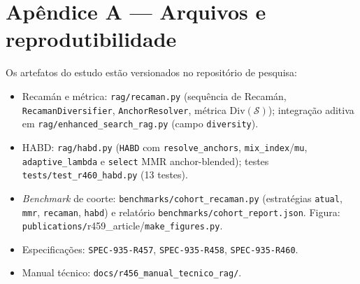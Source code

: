 \documentclass[11pt,a4paper]{article}
\newcommand{\Div}{\mathrm{Div}}
\begin{document}



\appendix
\section*{Apêndice A — Arquivos e reprodutibilidade}
Os artefatos do estudo estão versionados no repositório de pesquisa:
\begin{itemize}
  \item Recamán e métrica: \texttt{rag/recaman.py} (sequência de Recamán,
        \texttt{RecamanDiversifier}, \texttt{AnchorResolver}, métrica
        $\Div(\mathcal{S})$); integração aditiva em
        \texttt{rag/enhanced\_search\_rag.py} (campo \texttt{diversity}).
  \item HABD: \texttt{rag/habd.py} (\texttt{HABD} com \texttt{resolve\_anchors},
        \texttt{mix\_index}/\texttt{mu}, \texttt{adaptive\_lambda} e
        \texttt{select} MMR anchor-blended); testes
        \texttt{tests/test\_r460\_habd.py} (13 testes).
  \item \emph{Benchmark} de coorte: \texttt{benchmarks/cohort\_recaman.py}
        (estratégias \texttt{atual}, \texttt{mmr}, \texttt{recaman},
        \texttt{habd}) e relatório \texttt{benchmarks/cohort\_report.json}.
        Figura: \texttt{publications/}r459\_article\allowbreak/\texttt{make\_figures.py}.
  \item Especificações: \texttt{SPEC-935-R457}, \texttt{SPEC-935-R458},
        \texttt{SPEC-935-R460}.
  \item Manual técnico: \texttt{docs/r456\_manual\_tecnico\_rag/}.
\end{itemize}
\end{document}
